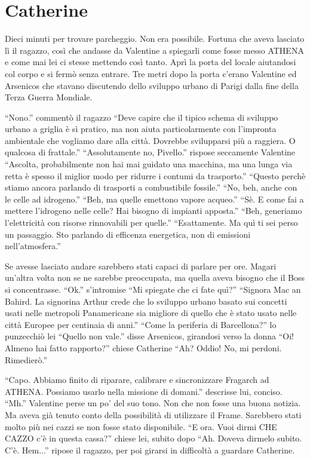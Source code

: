   \section*{Catherine}

    Dieci minuti per trovare parcheggio. Non era possibile. Fortuna che aveva lasciato lì il ragazzo, così che andasse
    da Valentine a spiegarli come fosse messo ATHENA e come mai lei ci stesse mettendo così tanto. Aprì la porta del
    locale aiutandosi col corpo e si fermò senza entrare. Tre metri dopo la porta c'erano Valentine ed Arsenicos che
    stavano discutendo dello sviluppo urbano di Parigi dalla fine della Terza Guerra Mondiale.

    ``Nono.'' commentò il ragazzo ``Deve capire che il tipico schema di sviluppo urbano a griglia è sì pratico, ma non
    aiuta particolarmente con l'impronta ambientale che vogliamo dare alla città. Dovrebbe svilupparsi più a raggiera. O
    qualcosa di frattale.'' ``Assolutamente no, Pivello.'' rispose seccamente Valentine ``Ascolta, probabilmente non hai
    mai guidato una macchina, ma una lunga via retta è spesso il miglior modo per ridurre i contumi da trasporto.''
    ``Questo perchè stiamo ancora parlando di trasporti a combustibile fossile.'' ``No, beh, anche con le celle ad
    idrogeno.'' ``Beh, ma quelle emettono vapore acqueo.'' ``Sè. E come fai a mettere l'idrogeno nelle celle? Hai
    bisogno di impianti apposta.'' ``Beh, generiamo l'elettricità con risorse rinnovabili per quelle.'' ``Esattamente.
    Ma quì ti sei perso un passaggio. Sto parlando di efficenza energetica, non di emissioni nell'atmosfera.''

    Se avesse lasciato andare sarebbero stati capaci di parlare per ore. Magari un'altra volta non se ne sarebbe
    preoccupata, ma quella aveva bisogno che il Boss si concentrasse. ``Ok.'' s'intromise ``Mi spiegate che ci fate
    quì?'' ``Signora Mac an Bahird. La signorina Arthur crede che lo sviluppo urbano basato sui concetti usati nelle
    metropoli Panamericane sia migliore di quello che è stato usato nelle città Europee per centinaia di anni.'' ``Come
    la periferia di Barcellona?'' lo punzecchiò lei ``Quello non vale.'' disse Arsenicos, girandosi verso la donna
    ``Oi! Almeno hai fatto rapporto?'' chiese Catherine ``Ah? Oddio! No, mi perdoni. Rimedierò.''

    ``Capo. Abbiamo finito di riparare, calibrare e sincronizzare Fragarch ad ATHENA. Possiamo usarlo nella missione di
    domani.'' descrisse lui, conciso. ``Mh.'' Valentine perse un po' del suo tono. Non che non fosse una buona notizia.
    Ma aveva già tenuto conto della possibilità di utilizzare il Frame. Sarebbero stati molto più nei cazzi se non
    fosse stato disponibile. ``E ora. Vuoi dirmi CHE CAZZO c'è in questa cassa?'' chiese lei, subito dopo ``Ah. Doveva
    dirmelo subito. C'è. Hem...'' ripose il ragazzo, per poi girarsi in difficoltà a guardare Catherine.

